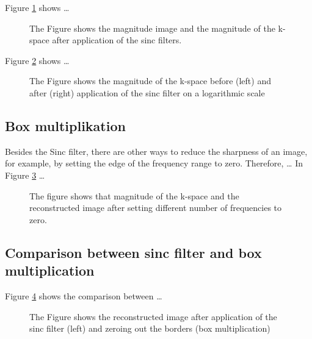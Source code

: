 \documentclass[%
	a4paper, %
	12pt, %
	english, %
	bibtotoc %
]{scrartcl}
\begin{document}
Figure \ref{fig:filterungsinc} shows \dots 

\begin{figure}
    \centering
    \vspace{5cm}
    \caption{The Figure shows the magnitude image and the magnitude of the k-space after application of the sinc filters.}
    \label{fig:filterungsinc}
\end{figure}

Figure \ref{fig:filterung-kspace} shows \dots

\begin{figure}
    \centering
    \vspace{5cm}
    \caption{The Figure shows the magnitude of the k-space before (left) and after (right) application of the sinc filter on a logarithmic scale}
    \label{fig:filterung-kspace}
\end{figure}

\subsection{Box multiplikation}
Besides the Sinc filter, there are other ways to reduce the sharpness of an image, for example, by setting the edge of the frequency range to zero.
Therefore, \dots
In Figure \ref{fig:box-mulitplikation} \dots

\begin{figure}
    \centering
    \vspace{5cm}
    \caption{The figure shows that magnitude of the k-space and the reconstructed image after setting different number of frequencies to zero.}
    \label{fig:box-mulitplikation}
\end{figure}

\subsection{Comparison between sinc filter and box multiplication}
Figure \ref{fig:boxvssinc} shows the comparison between \dots

\begin{figure}
    \centering
    \vspace{5cm}
    \caption{The Figure shows the reconstructed image after application of the sinc filter (left) and zeroing out the borders (box multiplication)}
    \label{fig:boxvssinc}
\end{figure}
\end{document}
